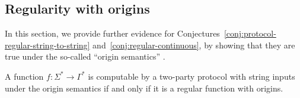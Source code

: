 \subsection{Regularity with origins}
\label{sec:origin-semantics}

In this section, we provide further evidence for
Conjectures~\ref{conj:protocol-regular-string-to-string}
and~\ref{conj:regular-continuous}, by showing that they are true under the
so-called ``origin semantics''
\cite{bojanczykTransducersOriginInformation2014}.

\begin{theorem}
  \label{thm:origin-string-to-string}
  A function $f: \Sigma^* \to \Gamma^*$ is computable by a
  two-party protocol with string inputs under the origin semantics if and only if
  it is a regular function with origins.
\end{theorem}



